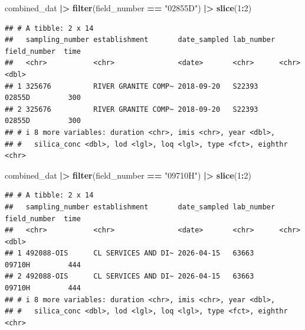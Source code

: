 \documentclass[
]{article}
\newenvironment{Shaded}{\begin{snugshade}}{\end{snugshade}}
\newcommand{\DecValTok}[1]{\textcolor[rgb]{0.00,0.00,0.81}{#1}}
\newcommand{\FunctionTok}[1]{\textcolor[rgb]{0.13,0.29,0.53}{\textbf{#1}}}
\newcommand{\NormalTok}[1]{#1}
\newcommand{\SpecialCharTok}[1]{\textcolor[rgb]{0.81,0.36,0.00}{\textbf{#1}}}
\newcommand{\StringTok}[1]{\textcolor[rgb]{0.31,0.60,0.02}{#1}}
\begin{document}
\begin{Shaded}
\begin{Highlighting}[]
\NormalTok{combined\_dat }\SpecialCharTok{|\textgreater{}} 
  \FunctionTok{filter}\NormalTok{(field\_number }\SpecialCharTok{==} \StringTok{"02855D"}\NormalTok{) }\SpecialCharTok{|\textgreater{}} 
  \FunctionTok{slice}\NormalTok{(}\DecValTok{1}\SpecialCharTok{:}\DecValTok{2}\NormalTok{)}
\end{Highlighting}
\end{Shaded}

\begin{verbatim}
## # A tibble: 2 x 14
##   sampling_number establishment       date_sampled lab_number field_number  time
##   <chr>           <chr>               <date>       <chr>      <chr>        <dbl>
## 1 325676          RIVER GRANITE COMP~ 2018-09-20   S22393     02855D         300
## 2 325676          RIVER GRANITE COMP~ 2018-09-20   S22393     02855D         300
## # i 8 more variables: duration <chr>, imis <chr>, year <dbl>,
## #   silica_conc <dbl>, lod <lgl>, loq <lgl>, type <fct>, eighthr <chr>
\end{verbatim}

\begin{Shaded}
\begin{Highlighting}[]
\NormalTok{combined\_dat }\SpecialCharTok{|\textgreater{}} 
  \FunctionTok{filter}\NormalTok{(field\_number }\SpecialCharTok{==} \StringTok{"09710H"}\NormalTok{) }\SpecialCharTok{|\textgreater{}} 
  \FunctionTok{slice}\NormalTok{(}\DecValTok{1}\SpecialCharTok{:}\DecValTok{2}\NormalTok{)}
\end{Highlighting}
\end{Shaded}

\begin{verbatim}
## # A tibble: 2 x 14
##   sampling_number establishment       date_sampled lab_number field_number  time
##   <chr>           <chr>               <date>       <chr>      <chr>        <dbl>
## 1 492088-OIS      CL SERVICES AND DI~ 2026-04-15   63663      09710H         444
## 2 492088-OIS      CL SERVICES AND DI~ 2026-04-15   63663      09710H         444
## # i 8 more variables: duration <chr>, imis <chr>, year <dbl>,
## #   silica_conc <dbl>, lod <lgl>, loq <lgl>, type <fct>, eighthr <chr>
\end{verbatim}
\end{document}
